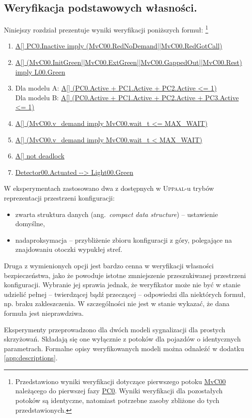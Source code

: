 \documentclass{pracamgr}
\newcommand{\ang}[1]{(ang.~\emph{#1})}
\newcommand{\upp}{\textsc{Uppaal}}
\newcommand{\ttt}[1]{\url{#1}}
\theoremstyle{plain}
\begin{document}
\subsection{Weryfikacja podstawowych własności.}
Niniejszy rozdział prezentuje wyniki weryfikacji poniższych formuł:
\footnote{Przedstawiono wyniki weryfikacji dotyczące pierwszego potoku
  \ttt{MvC00} należącego do pierwszej fazy \ttt{PC0}. Wyniki
  weryfikacji dla pozostałych potoków są identyczne, natomiast
  potrzebne zasoby zbliżone do tych przedstawionych.}
\begin{enumerate}
  \item \ttt{A[] PC0.Inactive imply (MvC00.RedNoDemand||MvC00.RedGotCall)}
  \item \ttt{A[]
  (MvC00.InitGreen||MvC00.ExtGreen||MvC00.GappedOut||MvC00.Rest) imply
  L00.Green}
  \item Dla modelu A: \ttt{A[] (PC0.Active + PC1.Active + PC2.Active
    <= 1)}\\
  Dla modelu B: \ttt{A[] (PC0.Active + PC1.Active + PC2.Active +
    PC3.Active <= 1)}
  \item \ttt{A[] (MvC00.v_demand imply MvC00.wait_t <= MAX_WAIT)}
  \item \ttt{A[] (MvC00.v_demand imply MvC00.wait_t < MAX_WAIT)}
  \item \ttt{A[] not deadlock}
  \item \ttt{Detector00.Actuated --> Light00.Green}
\end{enumerate}

W eksperymentach zastosowano dwa z dostępnych w \upp-u trybów
reprezentacji przestrzeni konfiguracji:
\begin{itemize}
  \item zwarta struktura danych \ang{compact data structure} -- ustawienie domyślne,
  \item nadaproksymacja -- przybliżenie zbioru konfiguracji z góry,
  polegające na znajdowaniu otoczki wypukłej stref.
\end{itemize}
Druga z wymienionych opcji jest bardzo cenna w weryfikacji własności
bezpieczeństwa, jako że powoduje istotne zmniejszenie przeszukiwanej
przestrzeni konfiguracji. Wybranie jej sprawia jednak, że weryfikator
może nie być w stanie udzielić pełnej -- twierdzącej bądź przeczącej
-- odpowiedzi dla niektórych formuł, np. braku zakleszczenia. W
szczególności nie jest w stanie wykazać, że dana formuła jest
nieprawdziwa.


Eksperymenty przeprowadzono dla dwóch modeli sygnalizacji dla prostych
skrzyżowań. Składają się one wyłącznie z potoków dla pojazdów o
identycznych parametrach. Formalne opisy weryfikowanych modeli można
odnaleźć w dodatku \ref{app:descriptions}.
\end{document}
